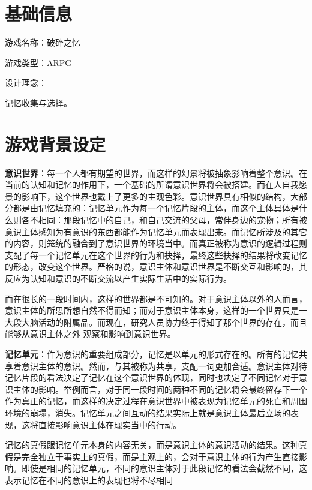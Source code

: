 \documentclass[12pt, a4paper]{article}
\begin{document}
    \section*{基础信息}
    游戏名称：破碎之忆

    游戏类型：ARPG

    设计理念：
    
        \quad 记忆收集与选择。
    \newpage 

    \section*{游戏背景设定}
        
        \textbf{意识世界}：每一个人都有期望的世界，而这样的幻景将被抽象影响着整个意识。在当前的认知和记忆的作用下，一个基础的所谓意识世界将会被搭建。而在人自我愿景的影响下，这个世界也戴上了更多的主观色彩。意识世界具有相似的结构，大部分都是由记忆填充的：记忆单元作为每一个记忆片段的主体，而这个主体具体是什么则各不相同：那段记忆中的自己，和自己交流的父母，常伴身边的宠物；所有被意识主体感知为有意识的东西都能作为记忆单元而表现出来。而记忆所涉及的其它的内容，则笼统的融合到了意识世界的环境当中。而真正被称为意识的逻辑过程则支配了每一个记忆单元在这个世界的行为和抉择，最终这些抉择的结果将改变记忆的形态，改变这个世界。严格的说，意识主体和意识世界是不断交互和影响的，其反应为认知和意识的不断交流以产生实际生活中的实际行为。 
        
       而在很长的一段时间内，这样的世界都是不可知的。对于意识主体以外的人而言，意识主体的所思所想自然不得而知；而对于意识主体本身，这样的一个世界只是一大段大脑活动的附属品。而现在，研究人员协力终于得知了那个世界的存在，而且能够从意识主体之外
        观察和影响到意识世界。 

        \medskip
        \textbf{记忆单元}：作为意识的重要组成部分，记忆是以单元的形式存在的。所有的记忆共享着意识主体的意识。然而，与其被称为共享，支配一词更加合适。意识主体对待记忆片段的看法决定了记忆在这个意识世界的体现，同时也决定了不同记忆对于意识主体的影响。举例而言，对于同一段时间的两种不同的记忆将会最终留存下一个作为真正的记忆，而这样的决定过程在意识世界中被表现为记忆单元的死亡和周围环境的崩塌，消失。记忆单元之间互动的结果实际上就是意识主体最后立场的表现，这将直接影响意识主体在现实当中的行动。 

        记忆的真假跟记忆单元本身的内容无关，而是意识主体的意识活动的结果。这种真假是完全独立于事实上的真假，而是主观上的，会对于意识主体的行为产生直接影响。即使是相同的记忆单元，不同的意识主体对于此段记忆的看法会截然不同，这表示记忆在不同的意识上的表现也将不尽相同
\end{document}
